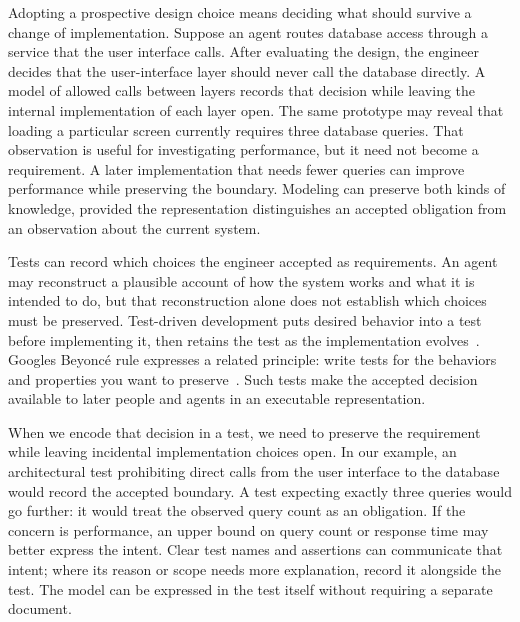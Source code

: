 Adopting a prospective design choice means deciding what should survive a change of implementation. Suppose an agent routes database access through a service that the user interface calls. After evaluating the design, the engineer decides that the user-interface layer should never call the database directly. A model of allowed calls between layers records that decision while leaving the internal implementation of each layer open. The same prototype may reveal that loading a particular screen currently requires three database queries. That observation is useful for investigating performance, but it need not become a requirement. A later implementation that needs fewer queries can improve performance while preserving the boundary. Modeling can preserve both kinds of knowledge, provided the representation distinguishes an accepted obligation from an observation about the current system.


Tests can record which choices the engineer accepted as requirements. An agent may reconstruct a plausible account of how the system works and what it is intended to do, but that reconstruction alone does not establish which choices must be preserved. Test-driven development puts desired behavior into a test before implementing it, then retains the test as the implementation evolves~\citep{beck1999xp}. Google\textquotesingle s Beyoncé rule expresses a related principle: write tests for the behaviors and properties you want to preserve~\citep{winters2020}. Such tests make the accepted decision available to later people and agents in an executable representation.

When we encode that decision in a test, we need to preserve the requirement while leaving incidental implementation choices open. In our example, an architectural test prohibiting direct calls from the user interface to the database would record the accepted boundary. A test expecting exactly three queries would go further: it would treat the observed query count as an obligation. If the concern is performance, an upper bound on query count or response time may better express the intent. Clear test names and assertions can communicate that intent; where its reason or scope needs more explanation, record it alongside the test. The model can be expressed in the test itself without requiring a separate document.

